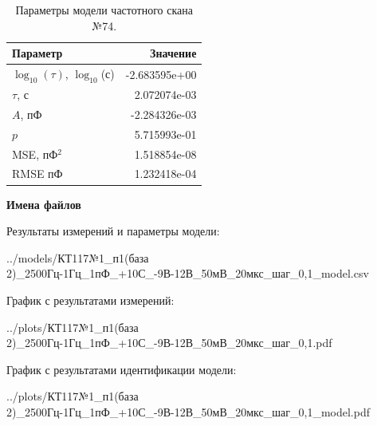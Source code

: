 \begin{table}[!ht]
    \centering
    \caption{Параметры модели частотного скана №74.}
    \begin{tabular}{|l|r|}
        \hline
        Параметр                                       & Значение                  \\ \hline
        $\log_{10}(\tau)$, $\log_{10}$(с)              & -2.683595e+00             \\ \hline
        $\tau$, с                                      & 2.072074e-03              \\ \hline
        $A$, пФ                                        & -2.284326e-03             \\ \hline
        $p$                                            & 5.715993e-01              \\ \hline
        MSE, пФ$^2$                                    & 1.518854e-08              \\ \hline
        RMSE пФ                                        & 1.232418e-04              \\ \hline
    \end{tabular}
    \label{table:frequency_scan_model_74}
\end{table}

\textbf{Имена файлов}

Результаты измерений и параметры модели:

\scriptsize../models/КТ117№1\_п1(база 2)\_2500Гц-1Гц\_1пФ\_+10С\_-9В-12В\_50мВ\_20мкс\_шаг\_0,1\_model.csv
\normalsize

График с результатами измерений:

\scriptsize../plots/КТ117№1\_п1(база 2)\_2500Гц-1Гц\_1пФ\_+10С\_-9В-12В\_50мВ\_20мкс\_шаг\_0,1.pdf
\normalsize

График с результатами идентификации модели:

\scriptsize../plots/КТ117№1\_п1(база 2)\_2500Гц-1Гц\_1пФ\_+10С\_-9В-12В\_50мВ\_20мкс\_шаг\_0,1\_model.pdf
\normalsize


